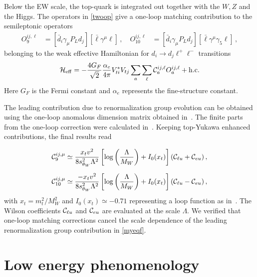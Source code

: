 \documentclass[aps,twocolumn,showpacs,preprintnumbers,amsmath,amssymb,floatfix,nofootinbib]{revtex4-1}
\newcommand{\C}{{\cal C}}
\begin{document}
Below the EW scale, the top-quark is integrated out together with the $W,Z$ and the Higgs.  The operators in \eqref{twoop} give a one-loop matching contribution to the semileptonic operators
%
\begin{align}  \label{o910}
O_{9}^{ij, \ell} &=  [   \bar d_i  \gamma_{\mu}   P_{L}   d_j   ][ \bar \ell \gamma^{\mu} \ell]   \,,  \quad O_{10}^{ij, \ell} &=  [   \bar d_i  \gamma_{\mu}   P_{L}   d_j   ][ \bar \ell \gamma^{\mu} \gamma_5 \ell] \,,
\end{align}
%
belonging to the weak effective Hamiltonian for $d_i \to d_j \ell^+ \ell^-$ transitions
%
\begin{align} 
\mathcal{H}_{\rm{eff}} = -  \frac{4 G_F}{\sqrt{2}}   \frac{\alpha_e}{4 \pi}  V_{ti}^*  V_{tj} \sum_{a}  \sum_{\ell}   \C_{a}^{ij,\ell}  O_{a}^{ij,\ell}     + \mathrm{h.c.} 
\end{align}
%
Here $G_F$ is the Fermi constant and $\alpha_e$ represents the fine-structure constant.



The leading contribution due to renormalization group evolution can be obtained using the one-loop anomalous dimension matrix obtained in~\cite{Jenkins:2013wua}.  The finite parts from the one-loop correction were calculated in~\cite{Aebischer:2015fzz}.  Keeping top-Yukawa enhanced contributions, the final results read~\cite{Celis:2017doq}


%
\begin{align} \label{myeqf}
\C_{9}^{ij,\mu}  &\simeq  \frac{x_t  v^2}{8 s_{ \theta_W}^2  \Lambda^2}    \left[    \log \left(  \frac{\Lambda}{M_W}\right)     + I_0(x_t)          \right]  (   \C_{\ell u} +   \C_{eu}  )  \,, \nonumber \\[0.2cm]
\C_{10}^{ij,\mu}   &\simeq   \frac{- x_t v^2}{8 s_{\theta_W}^2 \Lambda^2}   \left[    \log \left(  \frac{\Lambda}{M_W}\right)     + I_0(x_t)          \right]  (   \C_{\ell u} -   \C_{eu} )  \,,
\end{align}
%
with $x_t = m_t^2/M_W^2$ and $I_0(x_t) \simeq -0.71$ representing a loop function as in~\cite{Aebischer:2015fzz}.    The Wilson coefficients $\C_{\ell u}$ and $\C_{eu}$ are evaluated at the scale $\Lambda$.   We verified that one-loop matching corrections cancel the scale dependence of the leading renormalization group contribution in \eqref{myeqf}.



\section{Low energy phenomenology} \label{seclowph}
\end{document}
